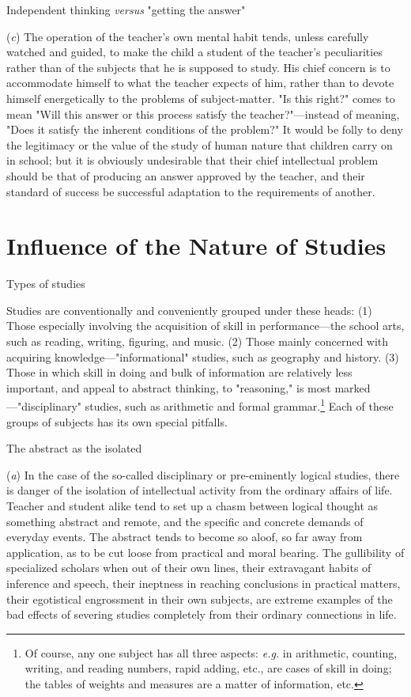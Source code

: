 \documentclass[letterpaper]{book}
\begin{document}
Independent thinking \emph{versus} "getting the answer"

(\emph{c}) The operation of the teacher's own mental habit tends, unless
carefully watched and guided, to make the child a student of the
teacher's peculiarities rather than of the subjects that he is supposed
to study. His chief concern is to accommodate himself to what
the
teacher expects of him, rather than to devote himself energetically to
the problems of subject-matter. "Is this right?" comes to mean "Will
this answer or this process satisfy the teacher?"---instead of meaning,
"Does it satisfy the inherent conditions of the problem?" It would be
folly to deny the legitimacy or the value of the study of human nature
that children carry on in school; but it is obviously undesirable that
their chief intellectual problem should be that of producing an answer
approved by the teacher, and their standard of success be successful
adaptation to the requirements of another.

\section{Influence of the Nature of Studies}

Types of studies

Studies are conventionally and conveniently grouped under these heads:
(1) Those especially involving the acquisition of skill in
performance---the school arts, such as reading, writing, figuring, and
music. (2) Those mainly concerned with acquiring
knowledge---"informational" studies, such as geography and history. (3)
Those in which skill in doing and bulk of information are relatively
less important, and appeal to abstract thinking, to "reasoning," is most
marked---"disciplinary" studies, such as arithmetic and formal
grammar.\footnote{
Of course, any one subject has all three aspects: \emph{e.g.} in
arithmetic, counting, writing, and reading numbers, rapid adding, etc.,
are cases of skill in doing; the tables of weights and measures are a
matter of information, etc.
}
Each of these groups of subjects has its own special pitfalls.

The abstract as the isolated

(\emph{a}) In the case of the so-called disciplinary or pre-eminently
logical studies, there is danger of the isolation of intellectual
activity from the ordinary
affairs
of life. Teacher and student alike tend to set up a chasm between
logical thought as something abstract and remote, and the specific and
concrete demands of everyday events. The abstract tends to become so
aloof, so far away from application, as to be cut loose from practical
and moral bearing. The gullibility of specialized scholars when out of
their own lines, their extravagant habits of inference and speech, their
ineptness in reaching conclusions in practical matters, their
egotistical engrossment in their own subjects, are extreme examples of
the bad effects of severing studies completely from their ordinary
connections in life.
\end{document}
